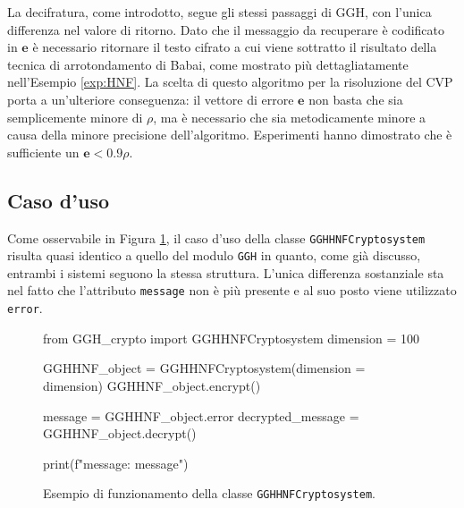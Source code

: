 La decifratura, come introdotto, segue gli stessi passaggi di GGH, con l'unica differenza 
nel valore di ritorno. Dato che il messaggio da recuperare è codificato in $\mathbf{e}$ è
necessario ritornare il testo cifrato a cui viene sottratto il risultato della tecnica
di arrotondamento di Babai, come mostrato più dettagliatamente nell'Esempio \ref{exp:HNF}. 
La scelta di questo algoritmo per la risoluzione del CVP porta a un'ulteriore conseguenza:
il vettore di errore $\mathbf{e}$ non basta che sia semplicemente minore di $\rho$, 
ma è necessario che sia metodicamente minore a causa della minore precisione dell'algoritmo. 
Esperimenti hanno dimostrato che è sufficiente un $\mathbf{e} < 0.9\rho$. 

\subsection{Caso d'uso}

Come osservabile in Figura \ref{fig:gghhnfmoduleexample}, il caso d'uso della classe 
\texttt{GGHHNFCryptosystem} risulta quasi identico a quello del
modulo \texttt{GGH} in quanto, come già discusso, entrambi i sistemi seguono la stessa struttura.  
L'unica differenza sostanziale sta nel fatto che l'attributo \texttt{message} non è più 
presente e al suo posto viene utilizzato \texttt{error}. 

\begin{figure}[h]
    \begin{python}
        from GGH_crypto import GGHHNFCryptosystem
        dimension = 100

        GGHHNF_object = GGHHNFCryptosystem(dimension = dimension)
        GGHHNF_object.encrypt()

        message = GGHHNF_object.error
        decrypted_message = GGHHNF_object.decrypt()

        print(f"message: {message}")
    \end{python}
    \caption{Esempio di funzionamento della classe \texttt{GGHHNFCryptosystem}.}
    \label{fig:gghhnfmoduleexample}
\end{figure}